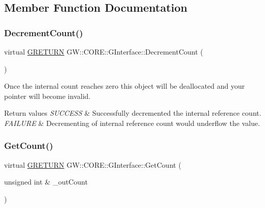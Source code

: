 \subsection{Member Function Documentation}
\hypertarget{class_g_w_1_1_c_o_r_e_1_1_g_interface_af6924e12b14f217b518fc91c63d9703d}{}\label{class_g_w_1_1_c_o_r_e_1_1_g_interface_af6924e12b14f217b518fc91c63d9703d} 
\subsubsection{\texorpdfstring{Decrement\+Count()}{DecrementCount()}}
{\footnotesize\ttfamily virtual \hyperlink{namespace_g_w_a69b1aaebac1cac8049825f035884c95b}{G\+R\+E\+T\+U\+RN} G\+W\+::\+C\+O\+R\+E\+::\+G\+Interface\+::\+Decrement\+Count (\begin{DoxyParamCaption}{ }\end{DoxyParamCaption})\hspace{0.3cm}{\ttfamily [pure virtual]}}

Once the internal count reaches zero this object will be deallocated and your pointer will become invalid.


\begin{DoxyRetVals}{Return values}
{\em S\+U\+C\+C\+E\+SS} & Successfully decremented the internal reference count. \\
\hline
{\em F\+A\+I\+L\+U\+RE} & Decrementing of internal reference count would underflow the value. \\
\hline
\end{DoxyRetVals}
\hypertarget{class_g_w_1_1_c_o_r_e_1_1_g_interface_a80f212dcdf60202cf9da49405863d1d5}{}\label{class_g_w_1_1_c_o_r_e_1_1_g_interface_a80f212dcdf60202cf9da49405863d1d5} 
\subsubsection{\texorpdfstring{Get\+Count()}{GetCount()}}
{\footnotesize\ttfamily virtual \hyperlink{namespace_g_w_a69b1aaebac1cac8049825f035884c95b}{G\+R\+E\+T\+U\+RN} G\+W\+::\+C\+O\+R\+E\+::\+G\+Interface\+::\+Get\+Count (\begin{DoxyParamCaption}\item[{unsigned int \&}]{\+\_\+out\+Count }\end{DoxyParamCaption})\hspace{0.3cm}{\ttfamily [pure virtual]}}


